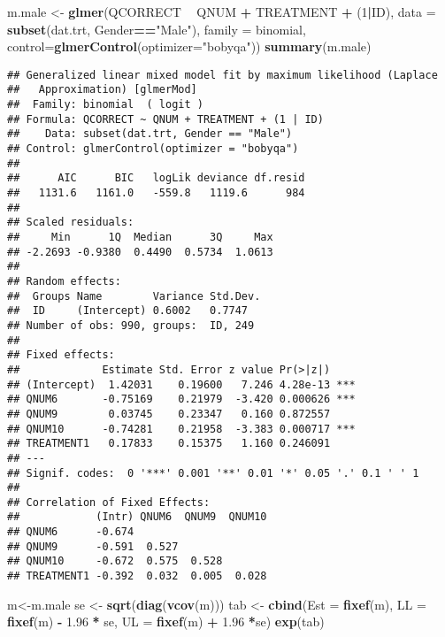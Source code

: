 \documentclass[]{article}
\newenvironment{Shaded}{\begin{snugshade}}{\end{snugshade}}
\newcommand{\KeywordTok}[1]{\textcolor[rgb]{0.13,0.29,0.53}{\textbf{#1}}}
\newcommand{\DataTypeTok}[1]{\textcolor[rgb]{0.13,0.29,0.53}{#1}}
\newcommand{\DecValTok}[1]{\textcolor[rgb]{0.00,0.00,0.81}{#1}}
\newcommand{\FloatTok}[1]{\textcolor[rgb]{0.00,0.00,0.81}{#1}}
\newcommand{\StringTok}[1]{\textcolor[rgb]{0.31,0.60,0.02}{#1}}
\newcommand{\OperatorTok}[1]{\textcolor[rgb]{0.81,0.36,0.00}{\textbf{#1}}}
\newcommand{\NormalTok}[1]{#1}
\begin{document}
\begin{Shaded}
\begin{Highlighting}[]
\NormalTok{m.male <-}\StringTok{ }\KeywordTok{glmer}\NormalTok{(QCORRECT }\OperatorTok{~}\StringTok{ }\NormalTok{QNUM }\OperatorTok{+}\StringTok{ }\NormalTok{TREATMENT }\OperatorTok{+}\StringTok{ }\NormalTok{(}\DecValTok{1}\OperatorTok{|}\NormalTok{ID), }
                \DataTypeTok{data =} \KeywordTok{subset}\NormalTok{(dat.trt, Gender}\OperatorTok{==}\StringTok{"Male"}\NormalTok{), }
                \DataTypeTok{family =}\NormalTok{ binomial, }\DataTypeTok{control=}\KeywordTok{glmerControl}\NormalTok{(}\DataTypeTok{optimizer=}\StringTok{"bobyqa"}\NormalTok{))}
\KeywordTok{summary}\NormalTok{(m.male)}
\end{Highlighting}
\end{Shaded}

\begin{verbatim}
## Generalized linear mixed model fit by maximum likelihood (Laplace
##   Approximation) [glmerMod]
##  Family: binomial  ( logit )
## Formula: QCORRECT ~ QNUM + TREATMENT + (1 | ID)
##    Data: subset(dat.trt, Gender == "Male")
## Control: glmerControl(optimizer = "bobyqa")
## 
##      AIC      BIC   logLik deviance df.resid 
##   1131.6   1161.0   -559.8   1119.6      984 
## 
## Scaled residuals: 
##     Min      1Q  Median      3Q     Max 
## -2.2693 -0.9380  0.4490  0.5734  1.0613 
## 
## Random effects:
##  Groups Name        Variance Std.Dev.
##  ID     (Intercept) 0.6002   0.7747  
## Number of obs: 990, groups:  ID, 249
## 
## Fixed effects:
##             Estimate Std. Error z value Pr(>|z|)    
## (Intercept)  1.42031    0.19600   7.246 4.28e-13 ***
## QNUM6       -0.75169    0.21979  -3.420 0.000626 ***
## QNUM9        0.03745    0.23347   0.160 0.872557    
## QNUM10      -0.74281    0.21958  -3.383 0.000717 ***
## TREATMENT1   0.17833    0.15375   1.160 0.246091    
## ---
## Signif. codes:  0 '***' 0.001 '**' 0.01 '*' 0.05 '.' 0.1 ' ' 1
## 
## Correlation of Fixed Effects:
##            (Intr) QNUM6  QNUM9  QNUM10
## QNUM6      -0.674                     
## QNUM9      -0.591  0.527              
## QNUM10     -0.672  0.575  0.528       
## TREATMENT1 -0.392  0.032  0.005  0.028
\end{verbatim}

\begin{Shaded}
\begin{Highlighting}[]
\NormalTok{m<-m.male}
\NormalTok{se <-}\StringTok{ }\KeywordTok{sqrt}\NormalTok{(}\KeywordTok{diag}\NormalTok{(}\KeywordTok{vcov}\NormalTok{(m)))}
\NormalTok{tab <-}\StringTok{ }\KeywordTok{cbind}\NormalTok{(}\DataTypeTok{Est =} \KeywordTok{fixef}\NormalTok{(m), }\DataTypeTok{LL =} \KeywordTok{fixef}\NormalTok{(m) }\OperatorTok{-}\StringTok{ }\FloatTok{1.96} \OperatorTok{*}\StringTok{ }\NormalTok{se, }\DataTypeTok{UL =} \KeywordTok{fixef}\NormalTok{(m) }\OperatorTok{+}\StringTok{ }\FloatTok{1.96} \OperatorTok{*}\NormalTok{se)}
\KeywordTok{exp}\NormalTok{(tab)}
\end{Highlighting}
\end{Shaded}
\end{document}
